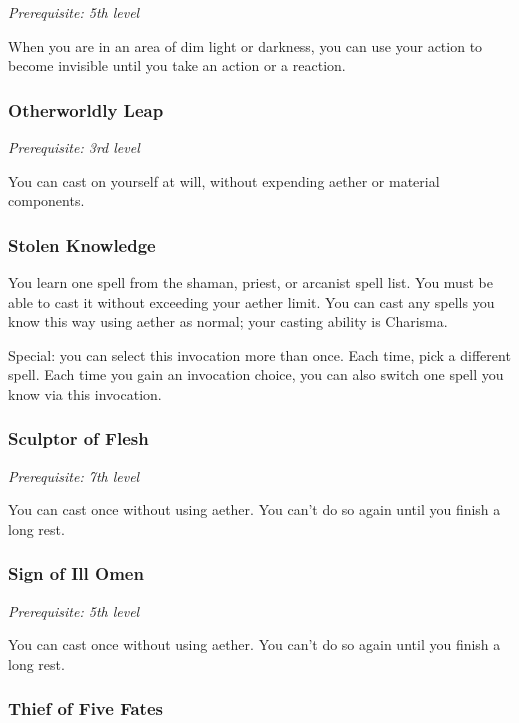 \textit{Prerequisite: 5th level}

When you are in an area of dim light or darkness, you can use your action to become invisible until you take an action or a reaction.

\subsubsection{Otherworldly Leap}

\textit{Prerequisite: 3rd level}

You can cast  on yourself at will, without expending aether or material components.

\subsubsection{Stolen Knowledge}

You learn one spell from the shaman, priest, or arcanist spell list. You must be able to cast it without exceeding your aether limit. You can cast any spells you know this way using aether as normal; your casting ability is Charisma.

Special: you can select this invocation more than once. Each time, pick a different spell. Each time you gain an invocation choice, you can also switch one spell you know via this invocation.

\subsubsection{Sculptor of Flesh}

\textit{Prerequisite: 7th level}

You can cast  once without using aether. You can't do so again until you finish a long rest.

\subsubsection{Sign of Ill Omen}

\textit{Prerequisite: 5th level}

You can cast  once without using aether. You can't do so again until you finish a long rest.

\subsubsection{Thief of Five Fates}

